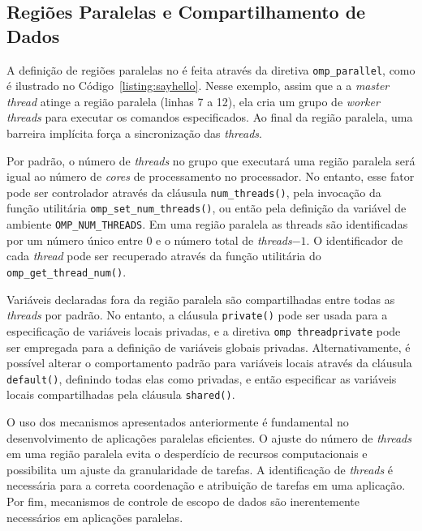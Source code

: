 \documentclass{SBCbookchapter}
\begin{document}
	\subsection{Regiões Paralelas e Compartilhamento de Dados}

		A definição de regiões paralelas no \openmp é feita através da
		diretiva \texttt{omp\_parallel}, como é ilustrado no Código~\ref{listing:sayhello}.
		Nesse exemplo, assim que a a \textit{master thread}
		atinge a região paralela (linhas 7 a 12), ela cria um grupo de
		\textit{worker threads} para executar os comandos especificados. Ao
		final da região paralela, uma barreira implícita força a
		sincronização das \textit{threads}.
		
		Por padrão, o número de \textit{threads} no grupo que executará uma região
		paralela será igual ao número de \textit{cores} de processamento no
		processador. No entanto, esse fator pode ser controlador através da
		cláusula \texttt{num\_threads()}, pela invocação da função
		utilitária \texttt{omp\_set\_num\_threads()}, ou então pela
		definição da variável de ambiente \texttt{OMP\_NUM\_THREADS}. Em uma região paralela
		as threads são identificadas por um número único entre $0$ e o número total de \textit{threads}$-1$.
		O identificador de cada \textit{thread} pode ser recuperado através da
		função utilitária do \openmp \texttt{omp\_get\_thread\_num()}.

		Variáveis declaradas fora da região paralela são compartilhadas entre
		todas as \textit{threads} por padrão. No entanto, a cláusula \texttt{private()}
		pode ser usada para a especificação de variáveis locais privadas, e a
		diretiva \texttt{omp threadprivate} pode ser empregada para a definição
		de variáveis globais privadas. Alternativamente, é possível alterar o
		comportamento padrão para variáveis locais através da cláusula
		\texttt{default()}, definindo todas elas como privadas, e então
		especificar as variáveis locais compartilhadas pela cláusula
		\texttt{shared()}.

		O uso dos mecanismos apresentados anteriormente é fundamental no
		desenvolvimento de aplicações paralelas eficientes. O ajuste do
		número de \textit{threads} em uma região paralela evita o desperdício de
		recursos computacionais e possibilita um ajuste da granularidade de
		tarefas. A identificação de \textit{threads} é necessária para a correta
		coordenação e atribuição de tarefas em uma aplicação. Por fim,
		mecanismos de controle de escopo de dados são inerentemente
		necessários em aplicações paralelas.
\end{document}
